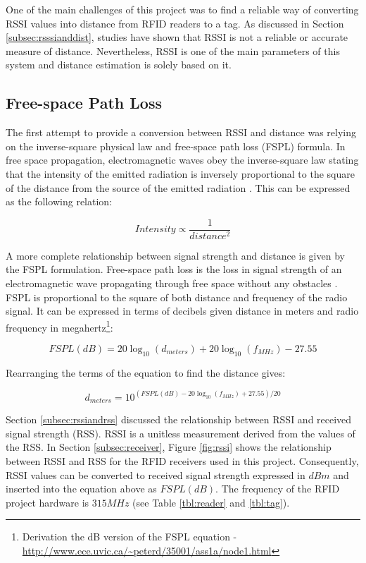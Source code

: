 One of the main challenges of this project was to find a reliable way of converting RSSI values into distance from RFID readers to a tag. As discussed in Section \ref{subsec:rsssianddist}, studies have shown that RSSI is not a reliable or accurate measure of distance. Nevertheless, RSSI is one of the main parameters of this system and distance estimation is solely based on it.

\subsection{Free-space Path Loss}

The first attempt to provide a conversion between RSSI and distance was relying on the inverse-square physical law and free-space path loss (FSPL) formula. In free space propagation, electromagnetic waves obey the inverse-square law stating that the intensity of the emitted radiation is inversely proportional to the square of the distance from the source of the emitted radiation \cite[p. 19]{Schlaikjer1962}. This can be expressed as the following relation:

\[ Intensity \propto \frac{1}{distance^{2}} \]

A more complete relationship between signal strength and distance is given by the FSPL formulation. Free-space path loss is the loss in signal strength of an electromagnetic wave propagating through free space without any obstacles \cite{Balanis2012}. FSPL is proportional to the square of both distance and frequency of the radio signal. It can be expressed in terms of decibels given distance in meters and radio frequency in megahertz\footnote{Derivation the dB version of the FSPL equation - \url{http://www.ece.uvic.ca/~peterd/35001/ass1a/node1.html}}: 

\[ FSPL(dB) = 20\log_{10}(d_{meters}) + 20\log_{10}(f_{MHz}) - 27.55 \]
	
Rearranging the terms of the equation to find the distance gives:

\[ d_{meters} = 10^{(FSPL(dB) - 20\log_{10}(f_{MHz}) + 27.55) / 20} \]

Section \ref{subsec:rssiandrss} discussed the relationship between RSSI and received signal strength (RSS). RSSI is a unitless measurement derived from the values of the RSS. In Section \ref{subsec:receiver}, Figure \ref{fig:rssi} shows the relationship between RSSI and RSS for the RFID receivers used in this project. Consequently, RSSI values can be converted to received signal strength expressed in $dBm$ and inserted into the equation above as $FSPL(dB)$. The frequency of the RFID project hardware is  $315MHz$ (see Table \ref{tbl:reader} and \ref{tbl:tag}).

